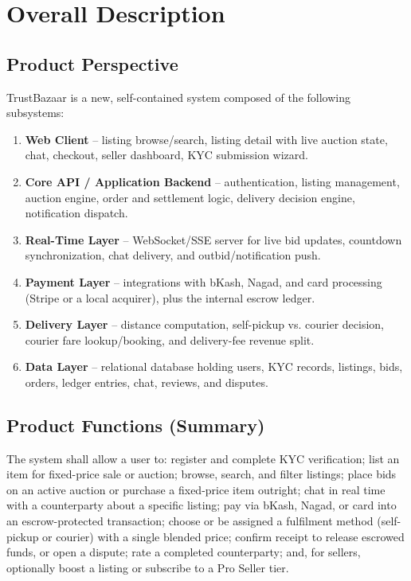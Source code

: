 \documentclass[11pt,a4paper]{report}
\begin{document}
\chapter{Overall Description}

\section{Product Perspective}
TrustBazaar is a new, self-contained system composed of the following subsystems:
\begin{enumerate}[nosep]
    \item \textbf{Web Client} -- listing browse/search, listing detail with live auction state, chat, checkout, seller dashboard, KYC submission wizard.
    \item \textbf{Core API / Application Backend} -- authentication, listing management, auction engine, order and settlement logic, delivery decision engine, notification dispatch.
    \item \textbf{Real-Time Layer} -- WebSocket/SSE server for live bid updates, countdown synchronization, chat delivery, and outbid/notification push.
    \item \textbf{Payment Layer} -- integrations with bKash, Nagad, and card processing (Stripe or a local acquirer), plus the internal escrow ledger.
    \item \textbf{Delivery Layer} -- distance computation, self-pickup vs. courier decision, courier fare lookup/booking, and delivery-fee revenue split.
    \item \textbf{Data Layer} -- relational database holding users, KYC records, listings, bids, orders, ledger entries, chat, reviews, and disputes.
\end{enumerate}

\section{Product Functions (Summary)}
The system shall allow a user to: register and complete KYC verification; list an item for fixed-price sale or auction; browse, search, and filter listings; place bids on an active auction or purchase a fixed-price item outright; chat in real time with a counterparty about a specific listing; pay via bKash, Nagad, or card into an escrow-protected transaction; choose or be assigned a fulfilment method (self-pickup or courier) with a single blended price; confirm receipt to release escrowed funds, or open a dispute; rate a completed counterparty; and, for sellers, optionally boost a listing or subscribe to a Pro Seller tier.
\end{document}
